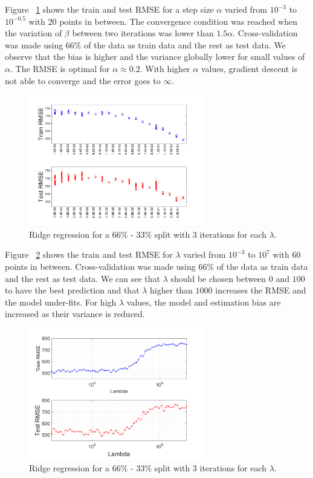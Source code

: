 \documentclass{article} %
\begin{document}
Figure ~\ref{fig:reg_alphaRMSE} shows the train and test RMSE for a step size $\alpha$ varied from $10^{-3}$ to $10^{-0.5}$ with $20$ points in between. The convergence condition was reached when the variation of $\beta$ between two iterations was lower than $1.5 \alpha$. Cross-validation was made using $66 \% $ of the data as train data and the rest as test data. We observe that the bias is higher and the variance globally lower for small values of $\alpha$. The RMSE is optimal for $\alpha \approx 0.2$. With higher $\alpha$ values, gradient descent is not able to converge and the error goes to $\infty$.

\begin{figure}[!h] %
	\center
	\includegraphics[width=3in]{figures/alphaRMSEBox.png}
	\caption{Ridge regression for a $66 \%$ - $33 \%$ split with 3 iterations for each $\lambda$.}
	\label{fig:reg_alphaRMSE}
\end{figure}

Figure ~\ref{fig:reg_lambdaRMSE} shows the train and test RMSE for $\lambda$ varied from $10^{-3}$ to $10^{7}$ with $60$ points in between. Cross-validation was made using $66 \% $ of the data as train data and the rest as test data. We can see that $\lambda$ should be chosen between $0$ and $100$ to have the best prediction and that $\lambda$ higher than $1000$ increases the RMSE and the model under-fits. For high $\lambda$ values, the model and estimation bias are increased as their variance is reduced.

\begin{figure}[!h] %
	\center
	\includegraphics[width=3in]{figures/lambdaRMSE.png}
	\caption{Ridge regression for a $66 \%$ - $33 \%$ split with 3 iterations for each $\lambda$.}
	\label{fig:reg_lambdaRMSE}
\end{figure}
\end{document}
